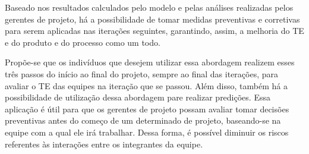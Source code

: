 Baseado nos resultados calculados pelo modelo e pelas análises realizadas pelos gerentes de projeto, há a possibilidade de tomar medidas preventivas e corretivas para serem aplicadas nas iterações seguintes, garantindo, assim, a melhoria do TE e do produto e do processo como um todo.

Propõe-se que os indivíduos que desejem utilizar essa abordagem realizem esses três passos do início ao final do projeto, sempre ao final das iterações, para avaliar o TE das equipes na iteração que se passou. Além disso, também há a possibilidade de utilização dessa abordagem pare realizar predições. Essa aplicação é útil para que os gerentes de projeto possam avaliar tomar decisões preventivas antes do começo de um determinado de projeto, baseando-se na equipe com a qual ele irá trabalhar. Dessa forma, é possível diminuir os riscos referentes às interações entre os integrantes da equipe. 